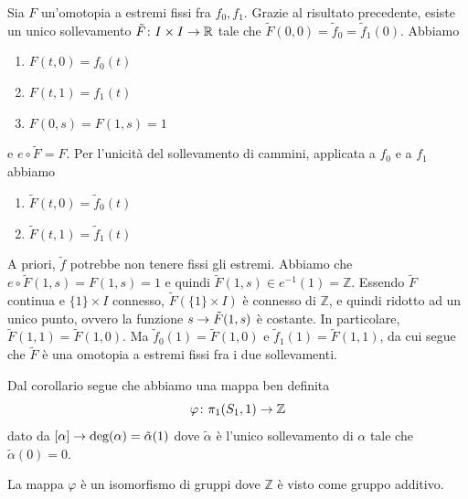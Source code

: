 \documentclass[a4paper]{article}
\begin{document}
\begin{snippetproof}{}
    Sia \(F\) un'omotopia a estremi fissi fra \(f_0, f_1\).
    Grazie al risultato precedente, esiste un unico sollevamento
    \(\tilde F \colon I \times I \to \mathbb{R}\)
    tale che \(\tilde F(0,0) = \tilde f_0 = \tilde f_1(0)\).
    Abbiamo
    \begin{enumerate}
        \item \(F(t,0) = f_0(t)\)
        \item \(F(t,1) = f_1(t)\)
        \item \(F(0,s) = F(1,s) = 1\)
    \end{enumerate}
    e \(e \circ \tilde F = F\).
    Per l'unicità del sollevamento di cammini, applicata a \(f_0\)
    e a \(f_1\) abbiamo
    \begin{enumerate}
        \item \(\tilde F(t,0) = \tilde f_0(t)\)
        \item \(\tilde F(t,1) = \tilde f_1(t)\)
    \end{enumerate}
    A priori, \(\tilde f\) potrebbe non tenere fissi gli estremi.
    Abbiamo che \(e \circ \tilde F(1,s) = F(1,s) = 1\)
    e quindi \(\tilde F(1,s) \in e^{-1}(1) = \mathbb{Z}\).
    Essendo \(\tilde F\) continua e \(\{1\} \times I\) connesso, \(\tilde F(\{1\} \times I)\)
    è connesso di \(\mathbb{Z}\), e quindi ridotto ad un unico punto,
    ovvero la funzione \(s \to \tilde F(1,s)\) è costante.
    In particolare, \(\tilde F(1,1) = \tilde F(1,0)\).
    Ma \(\tilde f_0(1) = \tilde F(1,0)\)
    e \(\tilde f_1(1) = \tilde F(1,1)\),
    da cui segue che \(\tilde F\) è una omotopia a estremi fissi fra i due sollevamenti.
\end{snippetproof}

Dal corollario segue che abbiamo una mappa ben definita
\[\varphi \colon \pi_1(S_1, 1) \to \mathbb{Z}\]
dato da \([\alpha] \to \text{deg}(\alpha) = \tilde \alpha(1)\)
dove \(\tilde \alpha\) è l'unico sollevamento di \(\alpha\) tale che \(\tilde \alpha(0) = 0\).

\begin{snippetproposition}{}
    La mappa \(\varphi\) è un isomorfismo di gruppi dove \(\mathbb{Z}\)
    è visto come gruppo additivo.
\end{snippetproposition}
\end{document}
